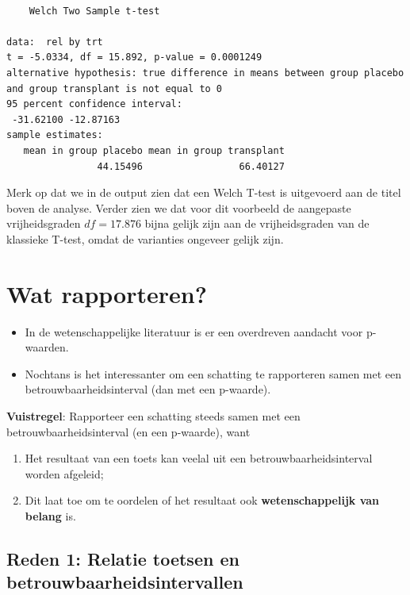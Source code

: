 \documentclass[
  dutch,
  letterpaper,
  12pt]{book}
\providecommand{\tightlist}{%
  \setlength{\itemsep}{0pt}\setlength{\parskip}{0pt}}
\theoremstyle{definition}
\theoremstyle{definition}
\theoremstyle{definition}
\theoremstyle{remark}
\begin{document}
\begin{verbatim}

    Welch Two Sample t-test

data:  rel by trt
t = -5.0334, df = 15.892, p-value = 0.0001249
alternative hypothesis: true difference in means between group placebo and group transplant is not equal to 0
95 percent confidence interval:
 -31.62100 -12.87163
sample estimates:
   mean in group placebo mean in group transplant 
                44.15496                 66.40127 
\end{verbatim}

Merk op dat we in de output zien dat een Welch T-test is uitgevoerd aan
de titel boven de analyse. Verder zien we dat voor dit voorbeeld de
aangepaste vrijheidsgraden \(df = 17.876\) bijna gelijk zijn aan de
vrijheidsgraden van de klassieke T-test, omdat de varianties ongeveer
gelijk zijn.

\section{Wat rapporteren?}\label{wat-rapporteren-1}

\begin{itemize}
\tightlist
\item
  In de wetenschappelijke literatuur is er een overdreven aandacht voor
  p-waarden.
\item
  Nochtans is het interessanter om een schatting te rapporteren samen
  met een betrouwbaarheidsinterval (dan met een p-waarde).
\end{itemize}

\textbf{Vuistregel}: Rapporteer een schatting steeds samen met een
betrouwbaarheidsinterval (en een p-waarde), want

\begin{enumerate}
\def\labelenumi{\arabic{enumi}.}
\tightlist
\item
  Het resultaat van een toets kan veelal uit een
  betrouwbaarheidsinterval worden afgeleid;
\item
  Dit laat toe om te oordelen of het resultaat ook
  \textbf{wetenschappelijk van belang} is.
\end{enumerate}

\subsection{Reden 1: Relatie toetsen en
betrouwbaarheidsintervallen}\label{reden-1-relatie-toetsen-en-betrouwbaarheidsintervallen}
\end{document}
